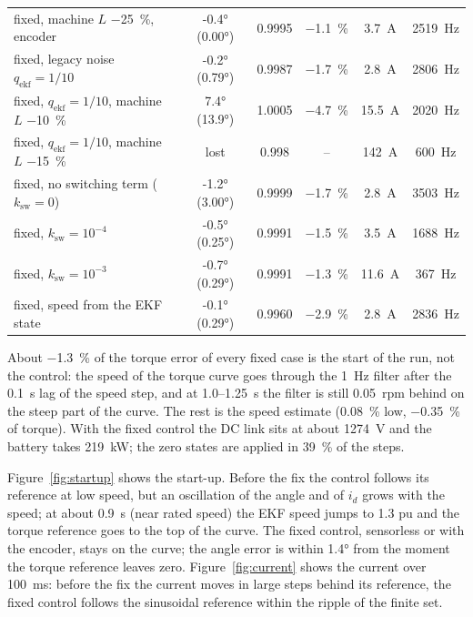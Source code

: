 \documentclass[11pt,a4paper]{scrartcl}
\newcommand{\ped}[1]{_{\mathrm{#1}}}
\begin{document}
\begin{onehalfspace}
\begin{table}[H]
\begin{tabularx}{\textwidth}{@{} X c c c c c @{}}
		fixed, machine $L$ \SI{-25}{\percent}, encoder & \ang{-0.4} (\ang{0.00}) & 0.9995 & \SI{-1.1}{\percent} & \SI{3.7}{\ampere} & \SI{2519}{\hertz} \\
		fixed, legacy noise $q\ped{ekf} = 1/10$ & \ang{-0.2} (\ang{0.79}) & 0.9987 & \SI{-1.7}{\percent} & \SI{2.8}{\ampere} & \SI{2806}{\hertz} \\
		fixed, $q\ped{ekf} = 1/10$, machine $L$ \SI{-10}{\percent} & \ang{+7.4} (\ang{13.9}) & 1.0005 & \SI{-4.7}{\percent} & \SI{15.5}{\ampere} & \SI{2020}{\hertz} \\
		fixed, $q\ped{ekf} = 1/10$, machine $L$ \SI{-15}{\percent} & lost & 0.998 & -- & \SI{142}{\ampere} & \SI{600}{\hertz} \\
		fixed, no switching term ($k\ped{sw} = 0$) & \ang{-1.2} (\ang{3.00}) & 0.9999 & \SI{-1.7}{\percent} & \SI{2.8}{\ampere} & \SI{3503}{\hertz} \\
		fixed, $k\ped{sw} = 10^{-4}$ & \ang{-0.5} (\ang{0.25}) & 0.9991 & \SI{-1.5}{\percent} & \SI{3.5}{\ampere} & \SI{1688}{\hertz} \\
		fixed, $k\ped{sw} = 10^{-3}$ & \ang{-0.7} (\ang{0.29}) & 0.9991 & \SI{-1.3}{\percent} & \SI{11.6}{\ampere} & \SI{367}{\hertz} \\
		fixed, speed from the EKF state & \ang{-0.1} (\ang{0.29}) & 0.9960 & \SI{-2.9}{\percent} & \SI{2.8}{\ampere} & \SI{2836}{\hertz} \\
		\bottomrule
	\end{tabularx}
\end{table}

About \SI{-1.3}{\percent} of the torque error of every fixed case is the start of the run, not the control: the speed of the torque curve goes through the \SI{1}{\hertz} filter after the \SI{0.1}{\second} lag of the speed step, and at 1.0--\SI{1.25}{\second} the filter is still \SI{0.05}{rpm} behind on the steep part of the curve. The rest is the speed estimate (\SI{0.08}{\percent} low, \SI{-0.35}{\percent} of torque). With the fixed control the DC link sits at about \SI{1274}{\volt} and the battery takes \SI{219}{\kilo\watt}; the zero states are applied in \SI{39}{\percent} of the steps.

Figure~\ref{fig:startup} shows the start-up. Before the fix the control follows its reference at low speed, but an oscillation of the angle and of $i_d$ grows with the speed; at about \SI{0.9}{\second} (near rated speed) the EKF speed jumps to \SI{1.3}{} pu and the torque reference goes to the top of the curve. The fixed control, sensorless or with the encoder, stays on the curve; the angle error is within \ang{1.4} from the moment the torque reference leaves zero. Figure~\ref{fig:current} shows the current over \SI{100}{\milli\second}: before the fix the current moves in large steps behind its reference, the fixed control follows the sinusoidal reference within the ripple of the finite set.


\end{onehalfspace}
\end{document}
